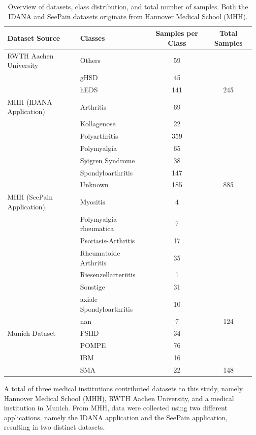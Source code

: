 \documentclass[12pt]{report}
\begin{document}
\begin{table}[h]
	\centering
	\begin{tabular}{|l|l|c|c|}
		\hline
		\textbf{Dataset Source} & \textbf{Classes} & \textbf{Samples per Class} & \textbf{Total Samples} \\
		\hline
		RWTH Aachen University & Others & 59 & \\
		& gHSD & 45 & \\
		& hEDS & 141 & 245 \\
		\hline
		MHH (IDANA Application) & Arthritis & 69 & \\
		& Kollagenose & 22 & \\
		& Polyarthritis & 359 & \\
		& Polymyalgia & 65 & \\
		& Sjögren Syndrome & 38 & \\
		& Spondyloarthritis & 147 & \\
		& Unknown & 185 & 885 \\
		\hline
		MHH (SeePain Application) & Myositis & 4 & \\
		& Polymyalgia rheumatica & 7 & \\
		& Psoriasis-Arthritis & 17 & \\
		& Rheumatoide Arthritis & 35 & \\
		& Riesenzellarteriitis & 1 & \\
		& Sonstige & 31 & \\
		& axiale Spondyloarthritis & 10 & \\
		& nan & 7 & 124 \\
		\hline
		Munich Dataset & FSHD & 34 & \\
		& POMPE & 76 & \\
		& IBM & 16 & \\
		& SMA & 22 & 148 \\
		\hline
	\end{tabular}
	\caption{Overview of datasets, class distribution, and total number of samples. Both the IDANA and SeePain datasets originate from Hannover Medical School (MHH).}
	\label{tab:dataset_overview}
\end{table}

A total of three medical institutions contributed datasets to this study, namely Hannover Medical School (MHH), RWTH Aachen University, and a medical institution in Munich. From MHH, data were collected using two different applications, namely the IDANA application and the SeePain application, resulting in two distinct datasets.\\
\end{document}

